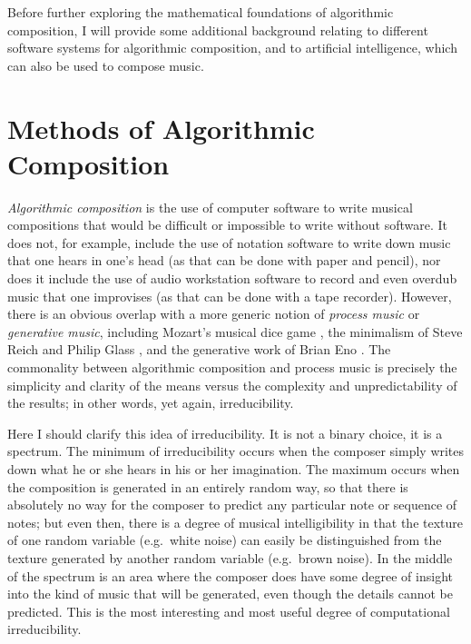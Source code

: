 \documentclass[11pt]{scrartcl}
\begin{document}
Before further exploring the mathematical foundations of algorithmic composition, I will provide some additional background relating to different software systems for algorithmic composition, and to artificial intelligence, which can also be used to compose music.

\section*{Methods of Algorithmic Composition}

\emph{Algorithmic composition} is the use of computer software to write musical compositions that would be difficult or impossible to write without software. It does not, for example, include the use of notation software to write down music that one hears in one's head (as that can be done with paper and pencil), nor does it include the use of audio workstation software to record and even overdub music that one improvises (as that can be done with a tape recorder). However, there is an obvious overlap with a more generic notion of \emph{process music} or \emph{generative music}, including Mozart's musical dice game \parencite{humdrumdice}, the minimalism of Steve Reich \parencite{reichprocess, 10.2307/832600} and Philip Glass \parencite{potter2002four, glass2015words}, and the generative work of Brian Eno \parencite{eno1996generative}. The commonality between algorithmic composition and process music is precisely the simplicity and clarity of the means versus the complexity and unpredictability of the results; in other words, yet again, irreducibility. 

Here I should clarify this idea of irreducibility. It is not a binary choice, it is a spectrum. The minimum of irreducibility occurs when the composer simply writes down what he or she hears in his or her imagination. The maximum occurs when the composition is generated in an entirely random way, so that there is absolutely no way for the composer to predict any particular note or sequence of notes; but even then, there is a degree of musical intelligibility in that the texture of one random variable (e.g.\ white noise) can easily be distinguished from the texture generated by another random variable (e.g.\ brown noise). In the middle of the spectrum is an area where the composer does have some degree of insight into the kind of music that will be generated, even though the details cannot be predicted. This is the most interesting and most useful degree of computational irreducibility.
\end{document}
